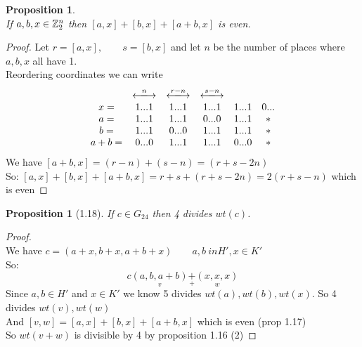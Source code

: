 \documentclass[]{amsart}
\newtheorem{prop}[thm]{Proposition}
\theoremstyle{definition}
\theoremstyle{remark}
\numberwithin{equation}{section}
\begin{document}
\begin{prop}\hfill\\
	If $a,b,x \in \mathbb{Z}_2^n$ then $[a,x] + [b,x] + [a+b,x]$ is even.\\
\end{prop}
\begin{proof}
	Let $r = [a,x],\qquad s = [b,x]$ and let $n$ be the number of places where $a,b,x$ all have 1.\\
	Reordering coordinates we can write
		\[
			\begin{matrix}
				& \xlongleftrightarrow{n} & \xlongleftrightarrow{r-n} & \xlongleftrightarrow{s-n}\\
			x  =& 1 ... 1  				  &1 ... 1 					  &1 ...1			&1 ...1		    & 0 ...  \\
			a  =& 1 ... 1  				  &1 ... 1 					  &0 ...0			&1 ...1		    & *  \\
			b  =& 1 ... 1  				  &0 ... 0 					  &1 ...1			&1 ...1		    & *  \\
			a+b=& 0 ... 0  				  &1 ... 1 					  &1 ...1			&0 ...0		    & *  \\
			\end{matrix}
		\]
		We have $[a+b, x] = (r-n) + (s-n) = (r+s-2n)$\\
		So: $[a,x] + [b,x] + [a+b,x] = r+s + (r+s-2n) = 2(r+s-n)$ which is even
\end{proof}

\begin{prop}[1.18]\hfill
If $c \in G_24$ then 4 divides $wt(c)$.
\end{prop}

\begin{proof}\hfill\\
	We have $c = (a+x, b+x, a+b+x)\qquad a,b \ in H', x\in K'$\\
	So: 
	\[c \underset{v}{(a,b, a+b)} \underset{+}{+} \underset{w}{(x,x,x)}\]
	Since $a,b \in H'$ and $x\in K'$ we know 5 divides $wt(a), wt(b), wt(x)$.
	So 4 divides $wt(v), wt(w)$\\
	And $[v,w] = [a,x] + [b,x] + [a+b, x]$ which is even (prop 1.17)\\
	So $wt(v+w)$ is divisible by 4 by proposition 1.16 (2)\end{proof}
\end{document}
